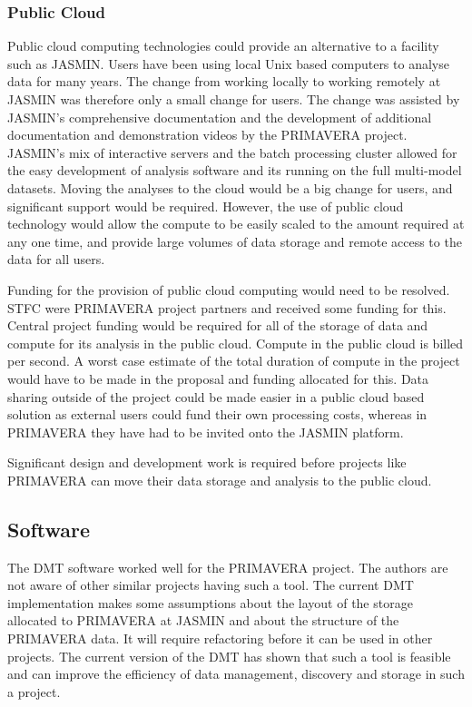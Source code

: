 \documentclass[gmd, manuscript]{copernicus}
\begin{document}
\subsubsection{Public Cloud}
Public cloud computing technologies could provide an alternative to a facility such as JASMIN. Users have been using local Unix based computers to analyse data for many years. The change from working locally to working remotely at JASMIN was therefore only a small change for users. The change was assisted by JASMIN's comprehensive documentation and the development of additional documentation and demonstration videos by the PRIMAVERA project. JASMIN's mix of interactive servers and the batch processing cluster allowed for the easy development of analysis software and its running on the full multi-model datasets. Moving the analyses to the cloud would be a big change for users, and significant support would be required. However, the use of public cloud technology would allow the compute to be easily scaled to the amount required at any one time, and provide large volumes of data storage and remote access to the data for all users.

Funding for the provision of public cloud computing would need to be resolved. STFC were PRIMAVERA project partners and received some funding for this. Central project funding would be required for all of the storage of data and compute for its analysis in the public cloud. Compute in the public cloud is billed per second. A worst case estimate of the total duration of compute in the project would have to be made in the proposal and funding allocated for this. Data sharing outside of the project could be made easier in a public cloud based solution as external users could fund their own processing costs, whereas in PRIMAVERA they have had to be invited onto the JASMIN platform.

Significant design and development work is required before projects like PRIMAVERA can move their data storage and analysis to the public cloud.

\subsection{Software}

The DMT software worked well for the PRIMAVERA project. The authors are not aware of other similar projects having such a tool. The current DMT implementation makes some assumptions about the layout of the storage allocated to PRIMAVERA at JASMIN and about the structure of the PRIMAVERA data. It will require refactoring before it can be used in other projects. The current version of the DMT has shown that such a tool is feasible and can improve the efficiency of data management, discovery and storage in such a project.
\end{document}
